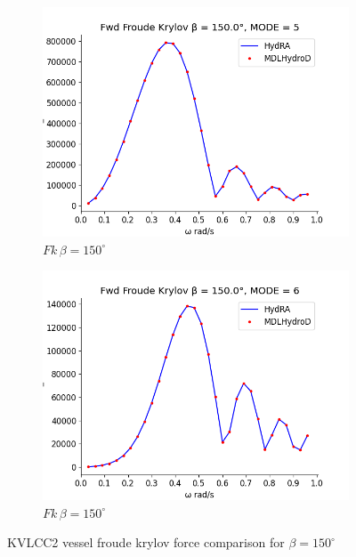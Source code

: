 \begin{figure}[H]
\begin{subfigure}[b]{0.49\textwidth}
        \includegraphics[width=\textwidth]{plots/kvlcc/fk/fk5.png}
        \caption{$Fk \, \beta = 150^{\circ}$}
    \end{subfigure}
    \begin{subfigure}[b]{0.49\textwidth}
        \includegraphics[width=\textwidth]{plots/kvlcc/fk/fk6.png}
        \caption{$Fk \, \beta = 150^{\circ}$}
    \end{subfigure}
    \caption{KVLCC2 vessel froude krylov force comparison for $\beta= 150^{\circ}$}
    \label{fig:kvlcc_froude_krylov}
\end{figure}

